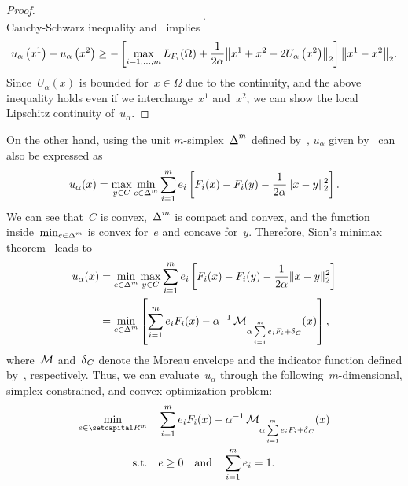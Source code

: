 \documentclass[../../main]{subfiles}
\begin{document}
\begin{proof}
\begin{equation}
        .\end{equation}
    Cauchy-Schwarz inequality and~ implies
    \begin{equation}
        u_\alpha\left(x^1\right) - u_\alpha\left(x^2\right) \ge - \left[ \max_{i = 1, \dots, m} L_{F_i}(\Omega) + \frac{1}{2 \alpha} \norm*{x^1 + x^2 - 2 U_\alpha\left(x^2\right)}_2\right] \norm*{x^1 - x^2}_2
        .\end{equation}
    Since~$U_\alpha(x)$ is bounded for~$x \in \Omega$ due to the continuity, and the above inequality holds even if we interchange~$x^1$ and~$x^2$, we can show the local Lipschitz continuity of~$u_\alpha$.
\end{proof}

On the other hand, using the unit $m$-simplex~$\operatorname{\Delta}^m$ defined by~, $u_\alpha$ given by~ can also be expressed as
\begin{equation}
    u_\alpha(x) = \max_{y \in C} \min_{e \in \operatorname{\Delta}^m} \sum_{i = 1}^{m} e_i \left[ F_i(x) - F_i(y) - \frac{1}{2 \alpha} \lVert x - y\rVert_2^2 \right]
    .\end{equation}
We can see that~$C$ is convex,~$\operatorname{\Delta}^m$ is compact and convex, and the function inside~$\min_{e \in \operatorname{\Delta}^m}$ is convex for~$e$ and concave for~$y$.
Therefore, Sion's minimax theorem~\cite{Sion1958} leads to
\begin{equation} \label{eq:u dual}
    \begin{split}
        u_\alpha(x) &= \min_{e \in \operatorname{\Delta}^m} \max_{y \in C} \sum_{i = 1}^{m} e_i \left[ F_i(x) - F_i(y) - \frac{1}{2 \alpha} \lVert x - y\rVert_2^2 \right] \\
        &= \min_{e \in \operatorname{\Delta}^m} \left[ \sum_{i = 1}^{m} e_i F_i(x) - \alpha^{-1} \operatorname{\mathcal{M}}_{\alpha \sum\limits_{i = 1}^{m} e_i F_i + \operatorname{\delta}_C} (x) \right]
        ,\end{split}
\end{equation}
where~$\operatorname{\mathcal{M}}$ and~$\operatorname{\delta}_C$ denote the Moreau envelope and the indicator function defined by~, respectively.
Thus, we can evaluate~$u_\alpha$ through the following~$m$-dimensional, simplex-constrained, and convex optimization problem:
\begin{equation} \label{eq:dual_reg_gap}
    \begin{aligned}
        \min_{e \in \setR^m} &  &  & \sum_{i = 1}^{m} e_i F_i(x) - \alpha^{-1} \envelope_{\alpha \sum\limits_{i = 1}^{m} e_i F_i + \indicator_C}(x) \\
        \st                  &  &  & e \ge 0 \eqand \sum_{i = 1}^{m} e_i = 1
        .\end{aligned}
\end{equation}
\end{document}
